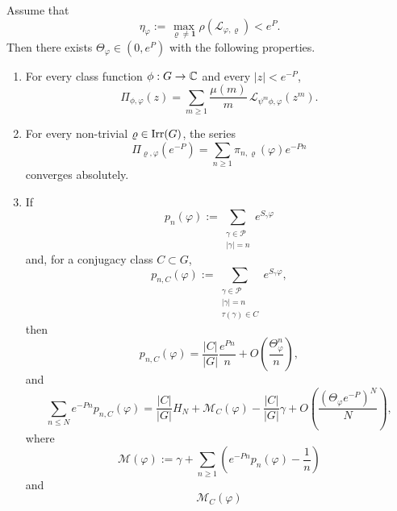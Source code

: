 \begin{theorem}
  \label{thm:holder-transfer-perron-point}
  Assume that
  \[
    \eta_\varphi
    :=
    \max_{\varrho\neq\mathbf 1}\rho(\mathscr L_{\varphi,\varrho})
    <e^P.
  \]
  Then there exists \(\Theta_\varphi\in(0,e^P)\) with the following
  properties.
  \begin{enumerate}[label=\textup{(\roman*)}]
    \item For every class function \(\phi:G\to\mathbb{C}\) and every
      \(|z|<e^{-P}\),
      \begin{equation}\label{eq:holder-transfer-adams-mobius}
        \Pi_{\phi,\varphi}(z)
        =
        \sum_{m\ge 1}\frac{\mu(m)}{m}\,
          \mathcal L_{\psi^m\phi,\varphi}(z^m).
      \end{equation}
    \item For every non-trivial \(\varrho\in\operatorname{Irr}(G)\), the series
      \[
        \Pi_{\varrho,\varphi}(e^{-P})
        =
        \sum_{n\ge 1}\pi_{n,\varrho}(\varphi)e^{-Pn}
      \]
      converges absolutely.
    \item If
      \[
        p_n(\varphi)
        :=
        \sum_{\substack{\gamma\in\mathcal P\\ |\gamma|=n}}
          e^{S_\gamma\varphi}
      \]
      and,
      for a conjugacy class \(C\subset G\),
      \[
        p_{n,C}(\varphi)
        :=
        \sum_{\substack{\gamma\in\mathcal P\\ |\gamma|=n\\
          \tau(\gamma)\in C}}
          e^{S_\gamma\varphi},
      \]
      then
      \begin{equation}\label{eq:holder-transfer-pointwise}
        p_{n,C}(\varphi)
        =
        \frac{|C|}{|G|}\frac{e^{Pn}}{n}
        +O\!\left(\frac{\Theta_\varphi^n}{n}\right),
      \end{equation}
      and
      \begin{equation}\label{eq:holder-transfer-mertens}
        \sum_{n\le N}e^{-Pn}p_{n,C}(\varphi)
        =
        \frac{|C|}{|G|}H_N
        +\mathcal M_C(\varphi)-\frac{|C|}{|G|}\gamma
        +O\!\left(\frac{(\Theta_\varphi e^{-P})^N}{N}\right),
      \end{equation}
      where
      \[
        \mathcal M(\varphi)
        :=
        \gamma+\sum_{n\ge 1}
          \left(e^{-Pn}p_n(\varphi)-\frac{1}{n}\right)
      \]
      and
      \begin{equation}\label{eq:holder-transfer-constant}
        \mathcal M_C(\varphi)

\end{equation}
\end{enumerate}
\end{theorem}
